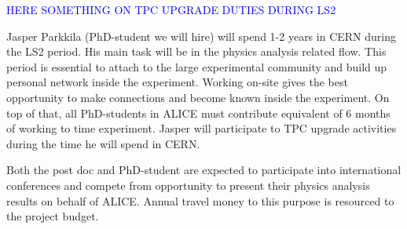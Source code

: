\textcolor{blue}{HERE SOMETHING ON TPC UPGRADE DUTIES DURING LS2}

Jasper Parkkila (PhD-student we will hire) will spend 1-2 years in CERN during the LS2 period. His main task will be in the physics analysis related flow. This period is essential to attach to the large experimental community and build up personal network inside the experiment. Working on-site gives the best opportunity to make connections and become known inside the experiment. On top of that, all PhD-students in ALICE must contribute equivalent of 6 months of working to time experiment. Jasper will participate to TPC upgrade activities during the time he will spend in CERN.

Both the post doc and PhD-student are expected to participate into international conferences and compete from opportunity to present their physics analysis results on behalf of ALICE. Annual travel money to this purpose is resourced to the project budget.

\nopagebreak
